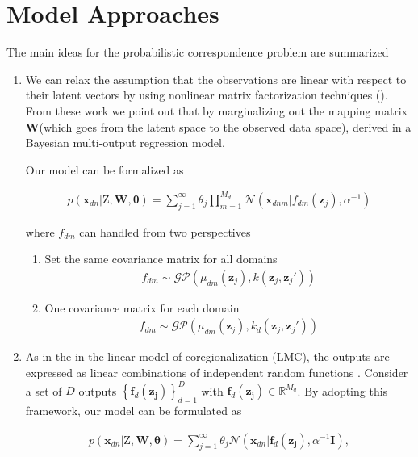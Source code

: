 \documentclass[]{article}
\newcommand{\gD}[2]{\mathcal{N}\left(#1,#2\right)}
\newcommand{\kernel}[2]{k\left(#1,#2\right)}
\newcommand{\Z}{\boldsymbol{\mathrm{Z}}}
\newcommand{\eye}{\mathbf{I}}
\newcommand{\indobj}{\mathbf{x}_{dn}}
\newcommand{\lvecI}{\mathbf{z}_j}
\newcommand{\GP}[2]{\mathcal{GP}\left(#1,#2\right)}
\begin{document}
\section{Model Approaches}

The main ideas for the probabilistic correspondence problem are summarized

\begin{enumerate}
	\item We can relax the assumption that the observations are linear with respect to their latent vectors by using nonlinear matrix factorization techniques (\cite{Lawrence09NMF}). From these work we point out that by marginalizing out the mapping matrix $\mathbf{W}$(which goes
	from the latent space to the observed data space), derived in a Bayesian multi-output regression model. 
	
	Our model can be formalized as
	
	\begin{align}
	p\left( {{\indobj}|{\Z},{\mathbf{{W}}},{\boldsymbol{\theta }}} \right) = \sum_{j=1}^{\infty} \theta_{j}{\prod_{m=1}^{M_d}\gD{\mathbf{x}_{dnm}|f_{dm}\left(\lvecI\right)}{\alpha^{-1}}}
	\end{align}
	
	where $f_{dm}$ can handled from two perspectives
	\begin{enumerate}
		\item Set the same covariance matrix for all domains
		\begin{align}
		f_{dm} \sim \GP{\mu_{dm}\left(\lvecI\right)}{\kernel{\lvecI}{\lvecI'}}
		\end{align}
		
		\item One covariance matrix for each domain
		\begin{align}
		f_{dm} \sim \GP{\mu_{dm}\left(\lvecI\right)}{k_d\left({\lvecI},{\lvecI'}\right)}
		\end{align}
	\end{enumerate}
	
	\item As in the in the linear model of coregionalization (LMC), the outputs are expressed as linear combinations
	of independent random functions \cite{Alvarez12KVF}. Consider a set of $D$ outputs $\left\{\mathbf{f}_d(\mathbf{\lvecI})\right\}_{d=1}^D$
    with $\mathbf{f}_d(\mathbf{\lvecI}) \in \mathbb{R}^{M_d}$. By adopting this framework, our model can be formulated as
    
    \begin{align}
    p\left( {{\indobj}|{\Z},{\mathbf{{W}}},{\boldsymbol{\theta }}} \right) = \sum_{j=1}^{\infty} \theta_j \gD{\indobj|\mathbf{f}_{d}(\mathbf{\lvecI})}{\alpha^{-1}\eye},
    \end{align}
    

\end{enumerate}
\end{document}
